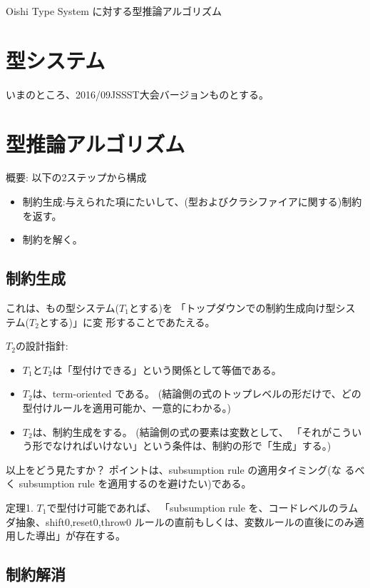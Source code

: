 \documentclass{jsarticle}
\begin{document}
\begin{center}
  Oishi Type System に対する型推論アルゴリズム
\end{center}

\section{型システム}

いまのところ、2016/09JSSST大会バージョンものとする。

\section{型推論アルゴリズム}

概要: 以下の2ステップから構成
\begin{itemize}
\item 制約生成:与えられた項にたいして、(型およびクラシファイアに関する)制約を返す。
\item 制約を解く。
\end{itemize}

\subsection{制約生成}

これは、もの型システム($T_1$とする)を
「トップダウンでの制約生成向け型システム($T_2$とする)」に変
形することであたえる。

$T_2$の設計指針:
\begin{itemize}
\item $T_1$と$T_2$は「型付けできる」という関係として等価である。
\item $T_2$は、term-oriented である。
  (結論側の式のトップレベルの形だけで、どの型付けルールを適用可能か、一意的にわかる。)
\item $T_2$は、制約生成をする。
  (結論側の式の要素は変数として、
  「それがこういう形でなければいけない」という条件は、制約の形で「生成」する。)
\end{itemize}

以上をどう見たすか？ ポイントは、subsumption rule の適用タイミング(な
るべく subsumption rule を適用するのを避けたい)である。

定理1. $T_1$で型付け可能であれば、
「subsumption rule を、コードレベルのラムダ抽象、shift0,reset0,throw0
ルールの直前もしくは、変数ルールの直後にのみ適用した導出」が存在する。


\subsection{制約解消}
\end{document}
